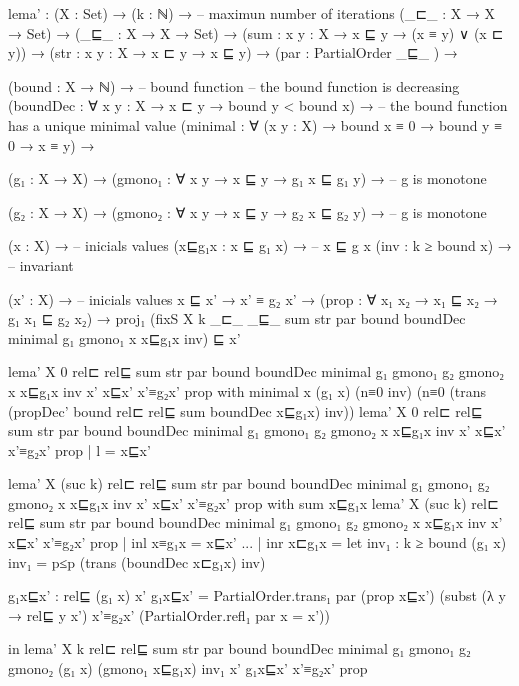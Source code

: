 lema' :  (X : Set) → 
       (k : ℕ) →               -- maximun number of iterations
       (_⊏_ : X → X → Set) →
       (_⊑_ : X → X → Set) → 
       (sum : {x y : X} → x ⊑ y → (x ≡ y) ∨ (x ⊏ y)) →   
       (str : {x y : X} → x ⊏ y → x ⊑ y) →
       (par : PartialOrder _⊑_ ) → 
       
       (bound : X → ℕ) →                     -- bound function 
       -- the bound function is decreasing 
       (boundDec : ∀ {x y : X} → x ⊏ y → bound y < bound x) →  
       -- the bound function has a unique minimal value
       (minimal : ∀ (x y : X) → bound x ≡ 0 → bound y ≡ 0 → x ≡ y) → 

       (g₁ : X → X) → 
       (gmono₁ : ∀ {x y} → x ⊑ y → g₁ x ⊑ g₁ y) → -- g is monotone

       (g₂ : X → X) → 
       (gmono₂ : ∀ {x y} → x ⊑ y → g₂ x ⊑ g₂ y) → -- g is monotone

       (x : X) →                 -- inicials values   
       (x⊑g₁x : x ⊑ g₁ x) →      -- x ⊑ g x 
       (inv : k ≥ bound x) →      -- invariant

       (x' : X) →                 -- inicials values   
       x ⊑ x' →
       x' ≡ g₂ x' → 
       (prop : ∀ {x₁ x₂} → x₁ ⊑ x₂ → g₁ x₁ ⊑ g₂ x₂) →  
       proj₁ (fixS X k _⊏_ _⊑_ sum str par bound boundDec minimal g₁ gmono₁ x x⊑g₁x inv) ⊑ x' 

lema' X 0 rel⊏  rel⊑ sum str par bound boundDec minimal g₁ gmono₁ g₂ gmono₂ x 
         x⊑g₁x inv x' x⊑x' x'≡g₂x' prop with minimal x (g₁ x) (n≡0 inv)
                    (n≡0 (trans (propDec' bound rel⊏  rel⊑ sum boundDec x⊑g₁x) inv))
lema' X 0 rel⊏  rel⊑ sum str par bound boundDec minimal g₁ gmono₁ g₂ gmono₂ x 
         x⊑g₁x inv x' x⊑x' x'≡g₂x' prop | l = x⊑x'

lema' X (suc k) rel⊏  rel⊑ sum str par bound boundDec minimal g₁ gmono₁ g₂ gmono₂ x 
         x⊑g₁x inv x' x⊑x' x'≡g₂x' prop  with sum x⊑g₁x
lema' X (suc k) rel⊏  rel⊑ sum str par bound boundDec minimal g₁ gmono₁ g₂ gmono₂ x 
         x⊑g₁x inv x' x⊑x' x'≡g₂x' prop | inl x≡g₁x = x⊑x' 
... | inr x⊏g₁x = let  inv₁ : k ≥ bound (g₁ x) 
                       inv₁ = p≤p (trans (boundDec x⊏g₁x) inv)
                       
                       g₁x⊑x' :  rel⊑ (g₁ x) x'
                       g₁x⊑x' = PartialOrder.trans₁ par (prop x⊑x')
                                                       (subst (λ y → rel⊑ y x') x'≡g₂x' (PartialOrder.refl₁ par {x = x'})) 

                in lema' X k rel⊏ rel⊑ sum str par bound boundDec minimal g₁ gmono₁ g₂
                  gmono₂ (g₁ x) (gmono₁ x⊑g₁x) inv₁ x' g₁x⊑x' x'≡g₂x' prop 


